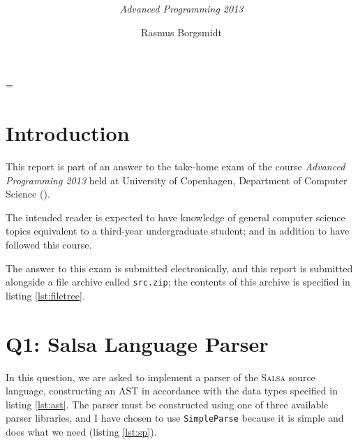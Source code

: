 \documentclass[
paper=a4,
oneside,
fontsize=11pt,
numbers=noenddot,
headinclude=false, %
footinclude=false, %
fleqn,             %
DIV=8
]{scrartcl}
\DeclareRobustCommand{\spacedlowsmallcaps}[1]{\MakeTextLowercase{\textsc{\lowsmallcapsspacing{#1}}}}%
\let\lstlistoflistings\listoflistings%
\begin{document}
\title{\textcolor{spot}{\rmfamily\mdseries\spacedlowsmallcaps{Exam Report}}}
\subtitle{\rmfamily\mdseries\itshape\normalsize{Advanced Programming 2013}}
\author{\large Rasmus Borgsmidt}
\date{}
\vspace{-30pt}\maketitle
{}
\setcounter{tocdepth}{2} %
\manualmark
\vspace{-30pt}\tableofcontents

\lstlistoflistings

\listoftables

\font%
\font%
\font=\font%

\clearpage
\section*{Introduction}

This report is part of an answer to the take-home exam of the course {\em
  Advanced Programming 2013} held at University of Copenhagen, Department of
Computer Science ().

The intended reader is expected to have knowledge of general computer
science topics equivalent to a third-year undergraduate student; and in addition
to have followed this course.

The answer to this exam is submitted electronically, and this report is
submitted alongside a file archive called {\tt src.zip}; the contents of this
archive is specified in listing \ref{lst:filetree}.

\section{Q1: Salsa Language Parser}

In this question, we are asked to implement a parser of the {\scshape Salsa}
source language, constructing an \ac{AST} in accordance with the data types
specified in listing \ref{lst:ast}. The parser must be constructed using one of
three available parser libraries, and I have chosen to use {\tt SimpleParse}
because it is simple and does what we need (listing \ref{lst:sp}).
\end{document}
